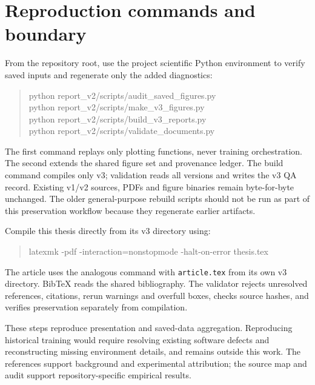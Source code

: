 \section{Reproduction commands and boundary}
From the repository root, use the project scientific Python environment to verify saved inputs and regenerate only the added diagnostics:
\begin{quote}\small\ttfamily
python report\_v2/scripts/audit\_saved\_figures.py\\
python report\_v2/scripts/make\_v3\_figures.py\\
python report\_v2/scripts/build\_v3\_reports.py\\
python report\_v2/scripts/validate\_documents.py
\end{quote}
The first command replays only plotting functions, never training orchestration. The second extends the shared figure set and provenance ledger. The build command compiles only v3; validation reads all versions and writes the v3 QA record. Existing v1/v2 sources, PDFs and figure binaries remain byte-for-byte unchanged. The older general-purpose rebuild scripts should not be run as part of this preservation workflow because they regenerate earlier artifacts.

Compile this thesis directly from its v3 directory using:
\begin{quote}\small\ttfamily
latexmk -pdf -interaction=nonstopmode -halt-on-error thesis.tex
\end{quote}
The article uses the analogous command with \texttt{article.tex} from its own v3 directory. BibTeX reads the shared bibliography. The validator rejects unresolved references, citations, rerun warnings and overfull boxes, checks source hashes, and verifies preservation separately from compilation.

These steps reproduce presentation and saved-data aggregation. Reproducing historical training would require resolving existing software defects and reconstructing missing environment details, and remains outside this work. The references support background and experimental attribution; the source map and audit support repository-specific empirical results.
